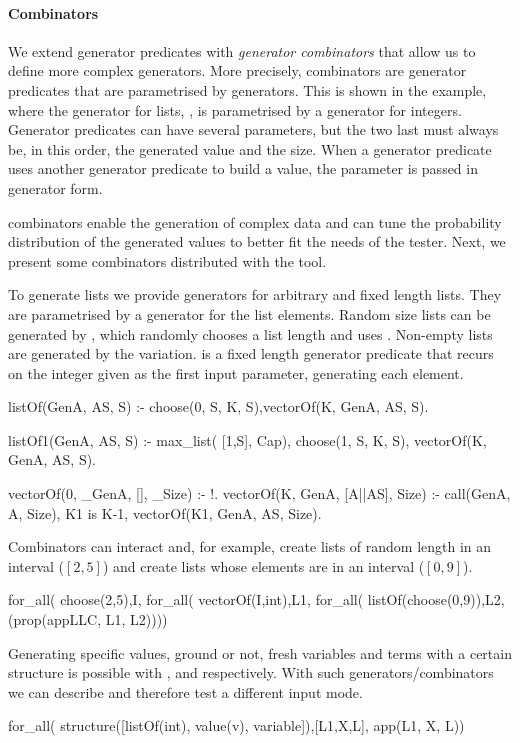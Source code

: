 \paragraph{\bf Combinators}
We extend generator predicates with \emph{generator combinators} that
allow us to define more complex generators.
%
More precisely, combinators are generator predicates that are parametrised by
generators.
%
This is shown in the  example, where the generator for lists,
, is parametrised by a generator for integers.
%
Generator predicates can have several parameters, but the two last
must always be, in this order, the generated value and the size.
%
When a generator predicate uses another generator predicate to build a
value, the parameter is passed in generator form.


\plqc{} combinators enable the generation of complex data and can tune
the probability distribution of the generated values to better fit the
needs of the tester.
%
Next, we present some combinators distributed with the tool.




To generate lists we provide generators for arbitrary and fixed length
lists.
%
They are parametrised by a generator for the list elements.
%
Random size lists can be generated by , which randomly
chooses a list length and uses . 
%
Non-empty lists are generated by the  variation.
%
 is a fixed length generator predicate that recurs on
the integer given as the first input parameter, generating each element.
\begin{yapcode}
 listOf(GenA, AS, S) :- choose(0, S, K, S),vectorOf(K, GenA, AS, S).

 listOf1(GenA, AS, S) :- max_list( [1,S], Cap),
   choose(1, S, K, S), vectorOf(K, GenA, AS, S).

 vectorOf(0, _GenA, [], _Size) :- !.
 vectorOf(K, GenA, [A||AS], Size) :-
   call(GenA, A, Size), K1 is K-1, vectorOf(K1, GenA, AS, Size).
\end{yapcode}
%
Combinators can interact and, for example, create lists of random length
in an interval ($[2,5]$) and create lists whose elements are in an
interval ($[0,9]$).
%
\begin{yapcode}
   for_all( choose(2,5),I, for_all( vectorOf(I,int),L1,
     for_all( listOf(choose(0,9)),L2, (prop({appLLC, L1, L2}))))
\end{yapcode}


Generating specific values, ground or not, fresh variables and terms
with a certain structure is possible with ,
 and  respectively.
%
With such generators/combinators we can describe and therefore test a
different input mode.
\begin{yapcode}
   for_all( structure([listOf(int), value(v), variable]),[L1,X,L],
     app(L1, X, L))
\end{yapcode}



